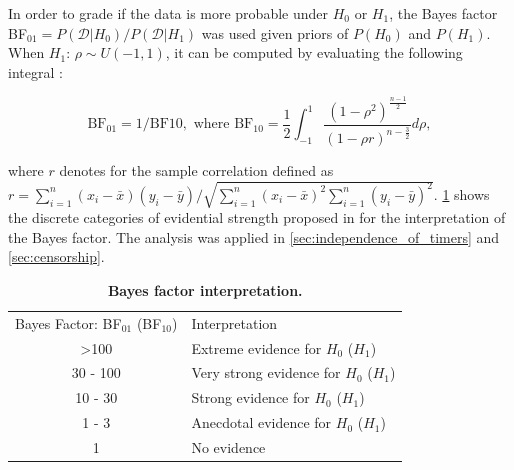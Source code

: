 \documentclass[11pt, a4paper]{article}
\begin{document}
In order to grade if the data is more probable under $H_0$ or $H_1$, the Bayes factor BF$_{01} = P(\mathcal{D} | H_0)/P(\mathcal{D} | H_1)$ was used given priors of $P(H_0)$ and $P(H_1)$. When $H_1$: $\rho \sim U(-1,1)$, it can be computed by evaluating the following integral \parencite{Jeffreys.1961, Wagenmakers.2016}:
\begin{linenomath*}
    \begin{equation*}
        \mathrm{BF}_{01} = 1/\mathrm{BF}{10}, \text{ where } \mathrm{BF}_{10} = \frac{1}{2}\int_{-1}^{1} \frac{(1 - \rho^2)^{\frac{n-1}{2}}}{(1 - \rho r)^{n-\frac{3}{2}}} d\rho,
    \end{equation*}
\end{linenomath*}
where $r$ denotes for the sample correlation defined as $r = \sum_{i=1}^n (x_i - \bar{x}) (y_i - \bar{y})/\sqrt{\sum_{i=1}^n (x_i - \bar{x})^2 \sum_{i=1}^n (y_i - \bar{y})^2}$. \cref{tab:bayes_factor_interpretation} shows the discrete categories of evidential strength proposed in \cite{Jeffreys.1961} for the interpretation of the Bayes factor. The analysis was applied in \cref{sec:independence_of_timers} and \cref{sec:censorship}.
\begin{table}[h]
    \centering
    \begin{tabular}{@{}cl@{}}
        \toprule
        Bayes Factor: BF$_{01}$ (BF$_{10}$) & Interpretation                         \\ \cmidrule(l){1-1} \cmidrule(l){2-2}
        \textgreater{}100                   & Extreme evidence for $H_0$ ($H_1$)     \\
        30 - 100                            & Very strong evidence for $H_0$ ($H_1$) \\
        10 - 30                             & Strong evidence for $H_0$ ($H_1$)      \\
        1 - 3                               & Anecdotal evidence for $H_0$ ($H_1$)   \\
        1                                   & No evidence      \\                 
        \bottomrule    
    \end{tabular}
    \caption{\textbf{Bayes factor interpretation.}}
    \label{tab:bayes_factor_interpretation}
\end{table}
\end{document}

